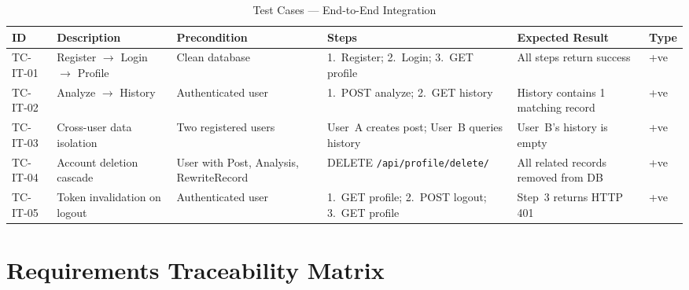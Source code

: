 \documentclass[12pt,a4paper]{report}
\begin{document}
\begin{itemize}
\begin{table}[H]
\raggedright
\caption{Test Cases --- End-to-End Integration}
\label{tab:tc_e2e}
\footnotesize
\begin{tabularx}{\linewidth}{|p{1.2cm}|p{2.5cm}|p{2.3cm}|p{2.8cm}|X|p{0.7cm}|}
\hline
\textbf{ID} & \textbf{Description} & \textbf{Precondition} & \textbf{Steps} & \textbf{Expected Result} & \textbf{Type} \\
\hline
TC-IT-01 & Register $\rightarrow$ Login $\rightarrow$ Profile & Clean database & 1.~Register; 2.~Login; 3.~GET profile & All steps return success & +ve \\
\hline
TC-IT-02 & Analyze $\rightarrow$ History & Authenticated user & 1.~POST analyze; 2.~GET history & History contains 1 matching record & +ve \\
\hline
TC-IT-03 & Cross-user data isolation & Two registered users & User~A creates post; User~B queries history & User~B's history is empty & +ve \\
\hline
TC-IT-04 & Account deletion cascade & User with Post, Analysis, RewriteRecord & DELETE \texttt{/api/profile/delete/} & All related records removed from DB & +ve \\
\hline
TC-IT-05 & Token invalidation on logout & Authenticated user & 1.~GET profile; 2.~POST logout; 3.~GET profile & Step~3 returns HTTP 401 & +ve \\
\hline
\end{tabularx}
\end{table}

\section{Requirements Traceability Matrix}


\end{itemize}
\end{document}
